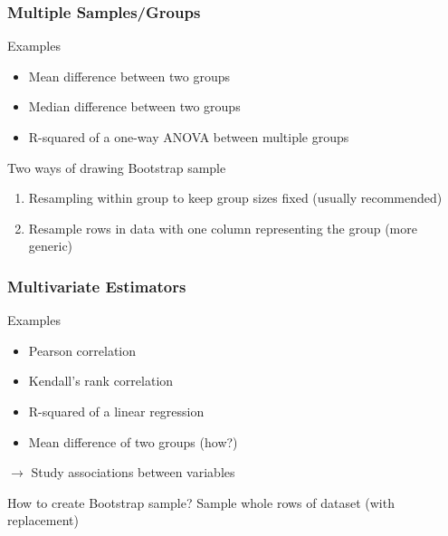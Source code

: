 \begin{frame}
	\frametitle{Multiple Samples/Groups}
	\begin{block}{Examples}
		\begin{itemize}
			\item Mean difference between two groups
			\item Median difference between two groups
			\item R-squared of a one-way ANOVA between multiple groups
		\end{itemize}
	\end{block}

	\vfill
	
	\begin{block}{Two ways of drawing Bootstrap sample}
		\begin{enumerate}
			\item Resampling within group to keep group sizes fixed (usually recommended)
			\item Resample rows in data with one column representing the group (more generic)
		\end{enumerate}
	\end{block}

	\vfill
	
	\begin{example}
	\end{example}

\end{frame}

\begin{frame}
	\frametitle{Multivariate Estimators}
	\begin{block}{Examples}
		\begin{itemize}
			\item Pearson correlation
			\item Kendall's rank correlation
			\item R-squared of a linear regression
			\item Mean difference of two groups (how?)
		\end{itemize}
		$\rightarrow$ Study associations between variables
	\end{block}
	
	\vfill
	
	\begin{block}{How to create Bootstrap sample?}
		Sample whole \alert{rows} of dataset (with replacement)
	\end{block}

	\vfill
	
	\begin{example}
	\end{example}

\end{frame}


